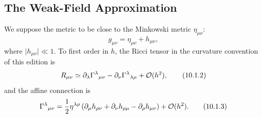 
\subsection{The Weak-Field Approximation}\label{sec:10.1}

We suppose the metric to be close to the Minkowski metric
\(\eta_{\mu\nu}\):
\begin{equation}
  g_{\mu\nu}=\eta_{\mu\nu}+h_{\mu\nu},
  \tag{10.1.1}\label{eq:10.1.1}
\end{equation}
where \(\lvert h_{\mu\nu}\rvert\ll1\). To first order in \(h\), the Ricci
tensor in the curvature convention of this edition is
\begin{equation}
  R_{\mu\nu}
  \simeq
  \partial_\lambda\Gamma^\lambda{}_{\mu\nu}
  -\partial_\nu\Gamma^\lambda{}_{\lambda\mu}
  +\mathcal{O}(h^2),
  \tag{10.1.2}\label{eq:10.1.2}
\end{equation}
and the affine connection is
\begin{equation}
  \Gamma^\lambda{}_{\mu\nu}
  =
  \frac12\eta^{\lambda\rho}
  \left(
    \partial_\mu h_{\rho\nu}
    +\partial_\nu h_{\rho\mu}
    -\partial_\rho h_{\mu\nu}
  \right)
  +\mathcal{O}(h^2).
  \tag{10.1.3}\label{eq:10.1.3}
\end{equation}

